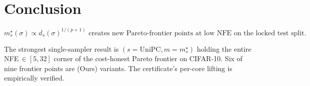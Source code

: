 \documentclass[11pt]{article}
\begin{document}
\section{Conclusion}

\[
\boxed{
m^\star_s(\sigma) \propto d_s(\sigma)^{1/(p+1)} \text{ creates new Pareto-frontier points at low NFE on the locked test split.}
}
\]

The strongest single-sampler result is \((s = \mathrm{UniPC}, m = m^\star_s)\)
holding the entire NFE\,\(\in [5, 32]\) corner of the cost-honest Pareto
frontier on CIFAR-10. Six of nine frontier points are (Ours) variants.
The certificate's per-core lifting is empirically verified.
\end{document}
